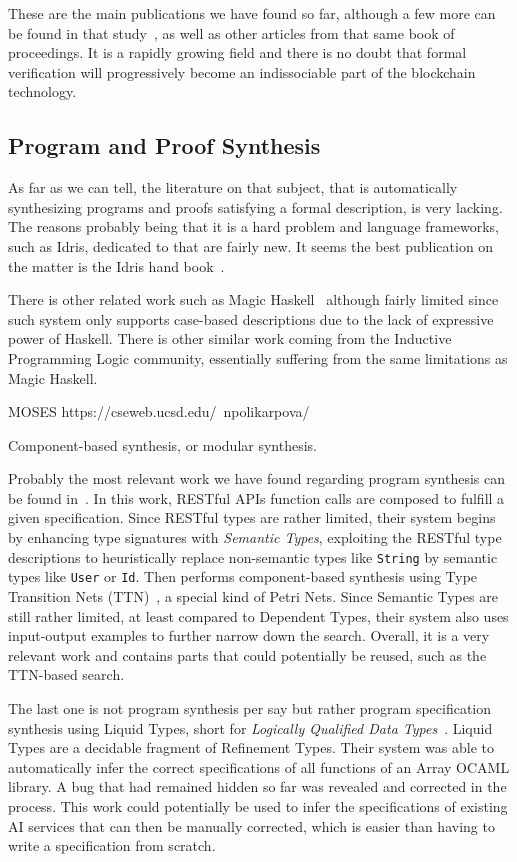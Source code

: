 \documentclass[]{report}
\begin{document}
These are the main publications we have found so far, although a few
more can be found in that study~\cite{Pace2020}, as well as other
articles from that same book of proceedings.  It is a rapidly growing
field and there is no doubt that formal verification will
progressively become an indissociable part of the blockchain
technology.

\subsection{Program and Proof Synthesis}

As far as we can tell, the literature on that subject, that is
automatically synthesizing programs and proofs satisfying a formal
description, is very lacking.  The reasons probably being that it is a
hard problem and language frameworks, such as Idris, dedicated to that
are fairly new.  It seems the best publication on the matter is the
Idris hand book~\cite{Brady2017}.

There is other related work such as Magic Haskell~\cite{} although
fairly limited since such system only supports case-based descriptions
due to the lack of expressive power of Haskell.  There is other
similar work coming from the Inductive Programming Logic community,
essentially suffering from the same limitations as Magic Haskell.

MOSES
https://cseweb.ucsd.edu/~npolikarpova/

Component-based synthesis, or modular synthesis.

Probably the most relevant work we have found regarding program
synthesis can be found in~\cite{Guo2022}.  In this work, RESTful APIs
function calls are composed to fulfill a given specification.  Since
RESTful types are rather limited, their system begins by enhancing
type signatures with \emph{Semantic Types}, exploiting the RESTful
type descriptions to heuristically replace non-semantic types like
\texttt{String} by semantic types like \texttt{User} or \texttt{Id}.
Then performs
component-based synthesis using Type Transition Nets
(TTN)~\cite{Feng2017, Guo2020}, a special kind of Petri Nets.  Since
Semantic Types are still rather limited, at least compared to
Dependent Types, their system also uses input-output examples to
further narrow down the search.  Overall, it is a very relevant work
and contains parts that could potentially be reused, such as the
TTN-based search.

The last one is not program synthesis per say but rather program
specification synthesis using Liquid Types, short for \emph{Logically
  Qualified Data Types}~\cite{Rondon2008}.  Liquid Types are a
decidable fragment of Refinement Types.  Their system was able to
automatically infer the correct specifications of all functions of an
Array OCAML library.  A bug that had remained hidden so far was
revealed and corrected in the process.  This work could potentially be
used to infer the specifications of existing AI services that can then
be manually corrected, which is easier than having to write a
specification from scratch.
\end{document}
